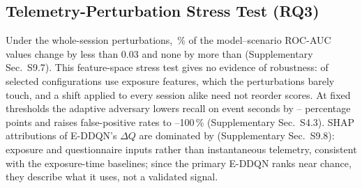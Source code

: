 \subsection{Telemetry-Perturbation Stress Test (RQ3)}
\label{sec:attack}
Under the whole-session perturbations, \AttAucFracSmall\,\% of the model--scenario ROC-AUC values change by less than 0.03 and none by more than \AttAucMaxAbsChange{} (Supplementary Sec.~S9.7). This feature-space stress test gives no evidence of robustness: \PHFsExposure{} of \PHFsTotal{} selected configurations use exposure features, which the perturbations barely touch, and a shift applied to every session alike need not reorder scores. At fixed thresholds the adaptive adversary lowers recall on event seconds by \AttEvasionDropMin--\AttEvasionDropMax{} percentage points and raises false-positive rates to \EDDQNAttWorstFPR--100\,\% (Supplementary Sec.~S4.3). SHAP attributions of E-DDQN's $\Delta Q$ are dominated by \ShapTopFive{} (Supplementary Sec.~S9.8): exposure and questionnaire inputs rather than instantaneous telemetry, consistent with the exposure-time baselines; since the primary E-DDQN ranks near chance, they describe what it uses, not a validated signal.
